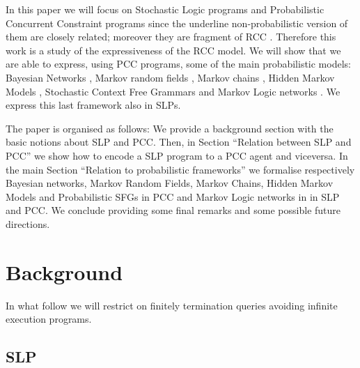 \documentclass[letterpaper]{article}
\theoremstyle{plain}
\theoremstyle{definition}
\theoremstyle{remark}
\theoremstyle{definition}
\begin{document}
In this paper we will focus on Stochastic Logic programs \cite{SLPcussens2000,SLPmuggleton96} and Probabilistic Concurrent Constraint programs  \cite{PCC} since the underline non-probabilistic version of them are closely related; moreover they are fragment of RCC \cite{RCC}. Therefore this work is a study of the expressiveness of the RCC model. We will show that we are able to express, using PCC programs, some of the main probabilistic models: 
Bayesian Networks  \cite{d1999inference,dechter1999bucket,B5} , Markov random fields \cite{MarkovRandomField}, Markov chains \cite{MarkovChain}, Hidden Markov Models \cite{MarkovChain}, Stochastic Context Free Grammars \cite{SCFG_1,SCFG_2} and Markov Logic networks \cite{markovLogicNetworks}. We express this last framework also in SLPs.


The paper is organised as follows: We provide a background section with the basic notions about SLP and PCC. Then, in Section ``Relation between SLP and PCC'' we show how to encode a SLP program to a PCC agent and viceversa.
In the main Section ``Relation to probabilistic frameworks'' we formalise respectively Bayesian networks, Markov Random Fields, Markov Chains,  Hidden Markov Models and Probabilistic SFGs in PCC and Markov Logic networks in in SLP and PCC.
We conclude providing some final remarks and some possible future directions.


\section{Background}
In what follow we will restrict on finitely termination queries avoiding infinite execution programs.
\subsection{SLP}
\end{document}
